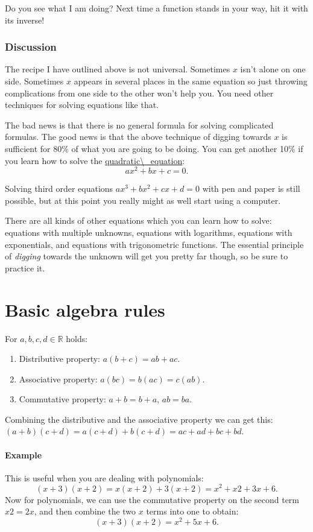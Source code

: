 \documentclass[journal]{IEEEtran}
\newcommand{\dokutitleleveltwo}[1]{\section{#1}}
\newcommand{\dokutitlelevelfour}[1]{\subsubsection{#1}}
\newcommand{\dokutitlelevelfive}[1]{\paragraph{#1}}
\newcommand{\dokuitalic}[1]{\textsl{#1}}
\newcommand{\dokuitem}{\item}
\begin{document}
Do you see what I am doing?
Next time a function stands in your way, hit it with its inverse!


\dokutitlelevelfour{Discussion}

The recipe I have outlined above is not universal.
Sometimes \(x\) isn't alone on one side. Sometimes \(x\) appears in several places in the same equation
so just throwing complications from one side to the other won't help you.
You need other techniques for solving equations like that.

The bad news is that there is no general formula for solving complicated formulas.
The good news is that the above technique of digging towards \(x\) is sufficient for 80\% 
of what you are going to be doing.
You can get another 10\% if you learn how to solve the \hyperref[470dad9cac00a9924004d164cb491a31]{quadratic{\textbackslash}\_equation}:
\[
  ax^2 +bx + c = 0.
\]

Solving third order equations \(ax^3+bx^2+cx+d=0\) with 
pen and paper is still possible, but at this point you really
might as well start using a computer. 

There are all kinds of other equations which you can learn how
to solve: equations with multiple unknowns, equations with
logarithms, equations with exponentials, and equations
with trigonometric functions.
The essential principle of \dokuitalic{digging}
towards the unknown will get you pretty far though, so be sure
to practice it.





\dokutitleleveltwo{Basic algebra rules}
\label{c3e38dc40d7a0015b4d8b65d875bd50b}%

For \(a,b,c,d\in\mathbb{R}\) holds:


\begin{enumerate}\dokuitem  Distributive property: \(a(b+c)=ab+ac\).
\dokuitem  Associative property: \(a(bc)=b(ac)=c(ab)\).
\dokuitem  Commutative property: \(a+b=b+a\), \(ab=ba\).
\end{enumerate}

Combining the distributive and the associative property we can get this: \\ 
\((a+b)(c+d)=a(c+d) + b(c+d) = ac+ad+bc+bd\).


\dokutitlelevelfive{Example}
This is useful when you are dealing with polynomials:
\[
  (x+3)(x+2)=x(x+2) + 3(x+2)= x^2 +x2 +3x + 6.
\]
Now for polynomials, we can use the commutative property
on the second term \(x2=2x\), and then combine the
two \(x\) terms into one to obtain:
\[
  (x+3)(x+2)= x^2 + 5x + 6.
\]
\end{document}
